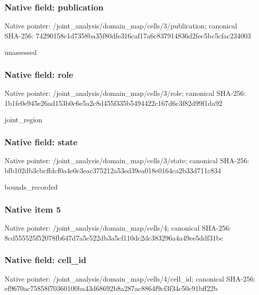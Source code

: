 \documentclass[10pt,a4paper]{article}
\begin{document}
\subsubsection{Native field: publication}
Native pointer: /joint\_\allowbreak{}analysis/domain\_\allowbreak{}map/cells/3/publication; canonical SHA-256: 74290158c1d7358ba35f80dfe316caf17a6c837914836d2fec5bc5cfac234003

\begingroup\raggedright\sloppy unassessed\par\endgroup

\subsubsection{Native field: role}
Native pointer: /joint\_\allowbreak{}analysis/domain\_\allowbreak{}map/cells/3/role; canonical SHA-256: 1b1fe0e945e26ad153b0c6e5a2c8d455f335b5494422c167d6c3f82d99f1da92

\begingroup\raggedright\sloppy joint\_\allowbreak{}region\par\endgroup

\subsubsection{Native field: state}
Native pointer: /joint\_\allowbreak{}analysis/domain\_\allowbreak{}map/cells/3/state; canonical SHA-256: bfb102db3cbcffdcf0a4e0c3eac375212a53ed39ea018e0164ca2b33d711c834

\begingroup\raggedright\sloppy bounds\_\allowbreak{}recorded\par\endgroup

\subsubsection{Native item 5}
Native pointer: /joint\_\allowbreak{}analysis/domain\_\allowbreak{}map/cells/4; canonical SHA-256: 8cd555525f52078fb647d7a5c522db3a5cf110dc2dc383296a4a49ee5ddf31bc

\subsubsection{Native field: cell\_\allowbreak{}id}
Native pointer: /joint\_\allowbreak{}analysis/domain\_\allowbreak{}map/cells/4/cell\_\allowbreak{}id; canonical SHA-256: ef9670ac75858f70360100ba43d68692b8a287ac8864f9cf3f34c50c91bff22b
\end{document}
